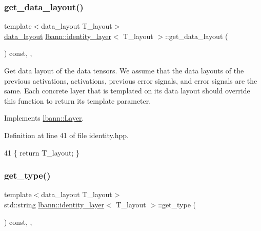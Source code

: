 \subsubsection{\texorpdfstring{get\+\_\+data\+\_\+layout()}{get\_data\_layout()}}
{\footnotesize\ttfamily template$<$data\+\_\+layout T\+\_\+layout$>$ \\
\hyperlink{base_8hpp_a786677cbfb3f5677b4d84f3056eb08db}{data\+\_\+layout} \hyperlink{classlbann_1_1identity__layer}{lbann\+::identity\+\_\+layer}$<$ T\+\_\+layout $>$\+::get\+\_\+data\+\_\+layout (\begin{DoxyParamCaption}{ }\end{DoxyParamCaption}) const\hspace{0.3cm}{\ttfamily [inline]}, {\ttfamily [override]}, {\ttfamily [virtual]}}

Get data layout of the data tensors. We assume that the data layouts of the previous activations, activations, previous error signals, and error signals are the same. Each concrete layer that is templated on its data layout should override this function to return its template parameter. 

Implements \hyperlink{classlbann_1_1Layer_a5dfb66e81fc085997402a5e2241316bd}{lbann\+::\+Layer}.



Definition at line 41 of file identity.\+hpp.


\begin{DoxyCode}
41 \{ \textcolor{keywordflow}{return} T\_layout; \}
\end{DoxyCode}
\mbox{\label{classlbann_1_1identity__layer_ac2032946d94c88d898e8f35d9e0ed799}} 
\subsubsection{\texorpdfstring{get\+\_\+type()}{get\_type()}}
{\footnotesize\ttfamily template$<$data\+\_\+layout T\+\_\+layout$>$ \\
std\+::string \hyperlink{classlbann_1_1identity__layer}{lbann\+::identity\+\_\+layer}$<$ T\+\_\+layout $>$\+::get\+\_\+type (\begin{DoxyParamCaption}{ }\end{DoxyParamCaption}) const\hspace{0.3cm}{\ttfamily [inline]}, {\ttfamily [override]}, {\ttfamily [virtual]}}

